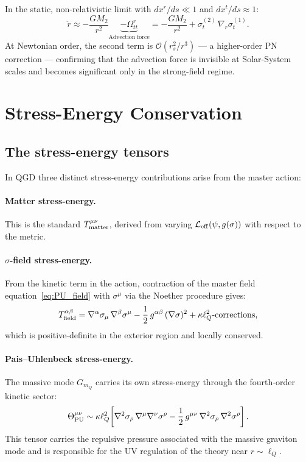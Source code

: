 \documentclass[11pt,a4paper]{article}
\theoremstyle{plain}
\theoremstyle{definition}
\theoremstyle{remark}
\newcommand{\sigt}{\sigma_t}
\newcommand{\lQ}{\ell_Q}
\newcommand{\mQ}{m_Q}
\begin{document}
In the static, non-relativistic limit with $dx^r/ds \ll 1$ and $dx^t/ds \approx 1$:
\begin{equation}
  \ddot r \approx
  -\frac{GM_2}{r^2}
  \underbrace{- \Omega^r_{tt}}_{\text{Advection force}}
  = -\frac{GM_2}{r^2}
  + \sigt^{(2)}\,\nabla_r\sigt^{(1)}.
  \label{eq:NR_limit}
\end{equation}
At Newtonian order, the second term is $\mathcal{O}(r_s^2/r^3)$ — a higher-order
PN correction — confirming that the advection force is invisible at Solar-System
scales and becomes significant only in the strong-field regime.

\section{Stress-Energy Conservation}
\label{sec:conservation}

\subsection{The stress-energy tensors}

In QGD three distinct stress-energy contributions arise from the master action:

\paragraph{Matter stress-energy.}
This is the standard $T^{\mu\nu}_{\rm matter}$, derived from varying
$\mathcal{L}_{\rm eff}(\psi, g(\sigma))$ with respect to the metric.

\paragraph{$\sigma$-field stress-energy.}
From the kinetic term in the action, contraction of the master field
equation~\eqref{eq:PU_field} with $\sigma^\mu$ via the Noether procedure gives:
\begin{equation}
  T^{\alpha\beta}_{\rm field}
  = \nabla^\alpha\sigma_\mu\,\nabla^\beta\sigma^\mu
  - \frac{1}{2}\,g^{\alpha\beta}\,(\nabla\sigma)^2
  + \kappa\lQ^2\text{-corrections},
  \label{eq:T_field}
\end{equation}
which is positive-definite in the exterior region and locally conserved.

\paragraph{Pais--Uhlenbeck stress-energy.}
The massive mode $G_{\mQ}$ carries its own stress-energy through the fourth-order
kinetic sector:
\begin{equation}
  \Theta^{\mu\nu}_{\rm PU}
  \sim \kappa\lQ^2
  \!\left[
    \nabla^2\sigma_\rho\,\nabla^\mu\nabla^\nu\sigma^\rho
    - \frac{1}{2}\,g^{\mu\nu}\,\nabla^2\sigma_\rho\,\nabla^2\sigma^\rho
  \right].
  \label{eq:T_PU}
\end{equation}
This tensor carries the repulsive pressure associated with the massive graviton mode
and is responsible for the UV regulation of the theory near $r \sim \lQ$.
\end{document}

